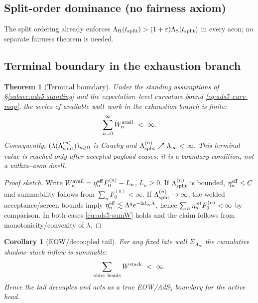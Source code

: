 \documentclass[10pt]{article}
\theoremstyle{definition}
\theoremstyle{plain}
\newtheorem{theorem}{Theorem}[section]
\newtheorem{corollary}{Corollary}[section]
\begin{document}
\subsection{Split-order dominance (no fairness axiom)}\label{subsec:uom-main-003}
The split ordering already enforces
$\Lambda_{\rm R}(t_{\rm split})>(1+\varepsilon)\Lambda_{\rm S}(t_{\rm split})$ in every aeon; no separate
fairness theorem is needed.

\subsection{Terminal boundary in the exhaustion branch}
\label{subsec:ads5-static-wall}

\begin{theorem}[Terminal boundary]
\label{thm:ads5-static}
Under the standing assumptions of \S\ref{subsec:ads5-standing} and the expectation--level curvature bound \eqref{eq:ads5-curv-map}, the series of available wall--work in the exhaustion branch is finite:
\begin{equation}
\sum_{n=0}^\infty W^{\rm avail}_n\ <\ \infty.
\label{eq:ads5-sumW}
\end{equation}
Consequently, $(\lambda(\Lambda^{(n)}_{\rm split}))_{n\ge 0}$ is Cauchy and $\Lambda^{(n)}_{\rm split}\nearrow \Lambda_\infty<\infty$. This terminal value is reached only after accepted payload ceases; it is a boundary condition, not a within--aeon dwell.
\end{theorem}

\begin{proof}[Proof sketch]
Write $W^{\rm avail}_n=\eta^{\rm eff}_n F^{(n)}_0 - L_n$, $L_n\ge 0$. If $\Lambda^{(n)}_{\rm split}$ is bounded, $\eta^{\rm eff}_n\le C$ and summability follows from $\sum_n F^{(n)}_0<\infty$. If $\Lambda^{(n)}_{\rm split}\to\infty$, the welded acceptance/screen bounds imply $\eta^{\rm eff}_n\lesssim \Lambda^q e^{-2 d_\infty \Lambda}$, hence $\sum_n \eta^{\rm eff}_n F^{(n)}_0<\infty$ by comparison. In both cases \eqref{eq:ads5-sumW} holds and the claim follows from monotonicity/convexity of $\lambda$.
\end{proof}

\begin{corollary}[EOW/decoupled tail]
\label{cor:ads5-eow}
For any fixed late wall $\Sigma_{\Lambda_\infty}$ the cumulative shadow--stack inflow is summable:
\[
\sum_{\text{older heads}} W^{\rm stack}\ <\ \infty.
\]
Hence the tail decouples and acts as a true EOW/AdS$_5$ boundary for the active head.
\end{corollary}
\end{document}
